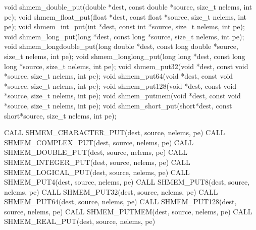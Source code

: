 
\begin{apidefinition}

\begin{Csynopsis}
void shmem_double_put(double *dest, const double *source, size_t nelems, int pe);
void shmem_float_put(float *dest, const float *source, size_t nelems, int pe);
void shmem_int_put(int *dest, const int *source, size_t nelems, int pe);
void shmem_long_put(long *dest, const long *source, size_t nelems, int pe);
void shmem_longdouble_put(long double *dest, const long double *source, size_t nelems, int pe);
void shmem_longlong_put(long long *dest, const long long *source, size_t nelems, int pe);
void shmem_put32(void *dest, const void *source, size_t nelems, int pe);
void shmem_put64(void *dest, const void *source, size_t nelems, int pe);
void shmem_put128(void *dest, const void *source, size_t nelems, int pe);
void shmem_putmem(void *dest, const void *source, size_t nelems, int pe);
void shmem_short_put(short*dest, const short*source, size_t nelems, int pe);
\end{Csynopsis}

\begin{Fsynopsis}
CALL SHMEM_CHARACTER_PUT(dest, source, nelems, pe)
CALL SHMEM_COMPLEX_PUT(dest, source, nelems, pe)
CALL SHMEM_DOUBLE_PUT(dest, source, nelems, pe)
CALL SHMEM_INTEGER_PUT(dest, source, nelems, pe)
CALL SHMEM_LOGICAL_PUT(dest, source, nelems, pe)
CALL SHMEM_PUT4(dest, source, nelems, pe)
CALL SHMEM_PUT8(dest, source, nelems, pe)
CALL SHMEM_PUT32(dest, source, nelems, pe)
CALL SHMEM_PUT64(dest, source, nelems, pe)
CALL SHMEM_PUT128(dest, source, nelems, pe)
CALL SHMEM_PUTMEM(dest, source, nelems, pe)
CALL SHMEM_REAL_PUT(dest, source, nelems, pe)
\end{Fsynopsis}

\begin{apiarguments}
\end{apiarguments}


\end{apidefinition}
